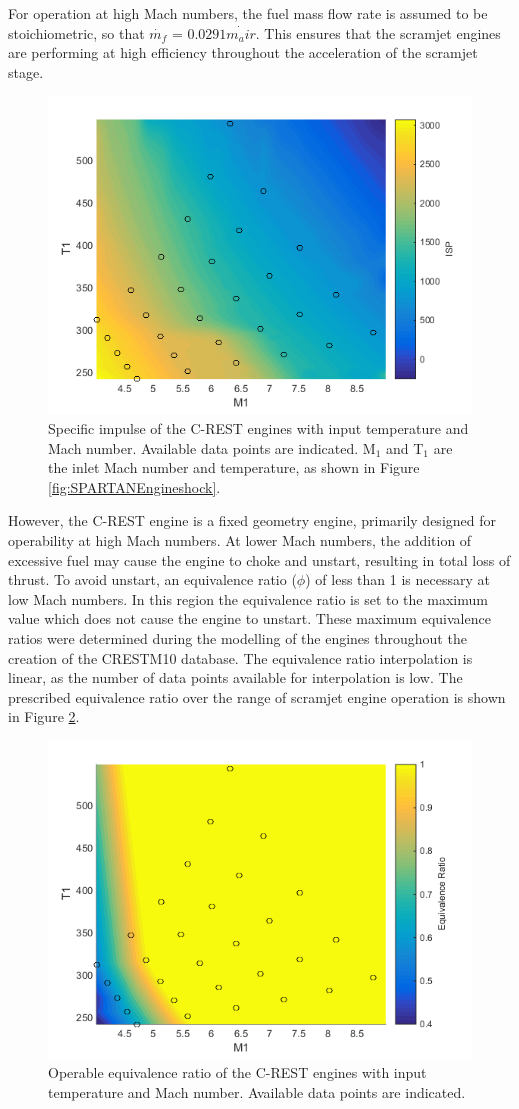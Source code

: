 For operation at high Mach numbers, the fuel mass flow rate is assumed to be stoichiometric, so that $\dot{m_f}$ = $0.0291\dot{m_air}$. This ensures that the scramjet engines are performing at high efficiency throughout the acceleration of the scramjet stage. 
\begin{figure}[ht]
	\centering
	\includegraphics[width=0.6\linewidth]{figures/3_vehicle_design/ISPinterp}
	\caption{Specific impulse of the C-REST engines with input temperature and Mach number. Available data points are indicated. M$_1$ and T$_1$ are the inlet Mach number and temperature, as shown in Figure \ref{fig:SPARTANEngineshock}.}
	\label{fig:ISPinterp}
\end{figure}
However, the C-REST engine is a fixed geometry engine, primarily designed for operability at high Mach numbers\cite{Preller2017b}. At lower Mach numbers, the addition of excessive fuel may cause the engine to choke and unstart, resulting in total loss of thrust\cite{Preller2017b}. To avoid unstart, an equivalence ratio ($\phi$) of less than 1 is necessary at low Mach numbers. In this region the equivalence ratio is set to the maximum value which does not cause the engine to unstart. These maximum equivalence ratios were determined during the modelling of the engines throughout the creation of the \textsf{CRESTM10} database. The equivalence ratio interpolation is linear, as the number of data points available for interpolation is low. The prescribed equivalence ratio over the range of scramjet engine operation is shown in Figure \ref{fig:EquivalenceRatioInterp}.
\begin{figure}[ht]
	\centering
	\includegraphics[width=0.6\linewidth]{figures/3_vehicle_design/EquivalenceRatioInterp}
	\caption{Operable equivalence ratio of the C-REST engines with input temperature and Mach number. Available data points are indicated.}
	\label{fig:EquivalenceRatioInterp}
\end{figure}
